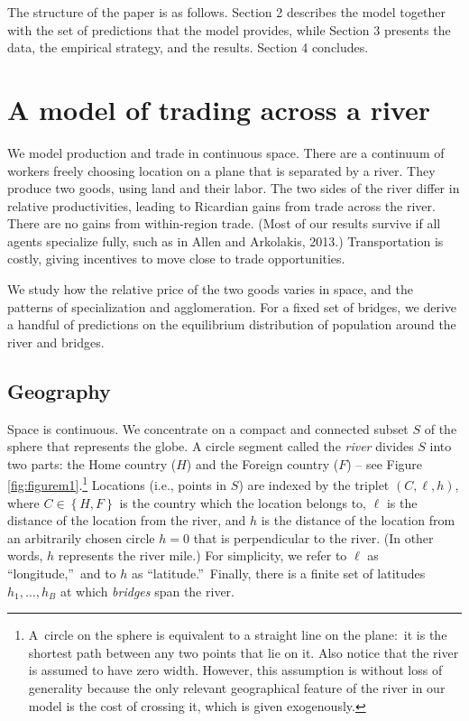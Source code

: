 \documentclass[12pt]{article}
\begin{document}
\bigskip 

The structure of the paper is as follows. Section 2 describes the model
together with the set of predictions that the model provides, while Section
3 presents the data, the empirical strategy, and the results. Section 4
concludes.

\section{A model of trading across a river}

We model production and trade in continuous space. There are a continuum of
workers freely choosing location on a plane that is separated by a river.
They produce two goods, using land and their labor. The two sides of the
river differ in relative productivities, leading to Ricardian gains from
trade across the river. There are no gains from within-region trade. (Most
of our results survive if all agents specialize fully, such as in Allen and
Arkolakis, 2013.) Transportation is costly, giving incentives to move close
to trade opportunities.

We study how the relative price of the two goods varies in space, and the
patterns of specialization and agglomeration. For a fixed set of bridges, we
derive a handful of predictions on the equilibrium distribution of
population around the river and bridges.

\subsection{Geography}

Space is continuous. We concentrate on a compact and connected subset $S$ of
the sphere that represents the globe. A circle segment called the \textit{%
river} divides $S$ into two parts: the Home country ($H$) and the Foreign
country ($F$) -- see Figure \ref{fig:figurem1}.\footnote{%
A\ circle on the sphere is equivalent to a straight line on the plane:\ it
is the shortest path between any two points that lie on it. Also notice that
the river is assumed to have zero width. However, this assumption is without
loss of generality because the only relevant geographical feature of the
river in our model is the cost of crossing it, which is given exogenously.}
Locations (i.e., points in $S$) are indexed by the triplet $\left( C,\ell
,h\right) $, where $C\in \left \{ H,F\right \} $ is the country which the
location belongs to, $\ell $ is the distance of the location from the river,
and $h$ is the distance of the location from an arbitrarily chosen circle $%
h=0$ that is perpendicular to the river. (In other words, $h$ represents the river mile.) For simplicity, we refer to $\ell $
as \textquotedblleft longitude,\textquotedblright \ and to $h$ as
\textquotedblleft latitude.\textquotedblright \ Finally, there is a finite
set of latitudes $h_{1},\ldots ,h_{B}$ at which \textit{bridges} span the
river.
\end{document}
